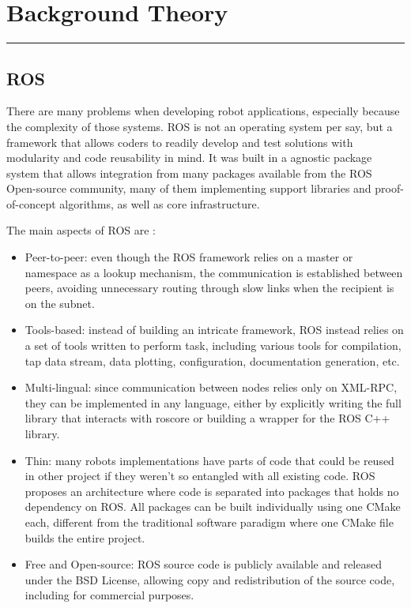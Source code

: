 \chapter{Background Theory}\label{chp:fundament}
\vspace{-1.5cm}
\noindent\rule{\columnwidth}{1.2mm}

%

\section{ROS}

There are many problems when developing robot applications, especially because the complexity of those systems. ROS is not an operating system per say, but a framework that allows coders to readily develop and test solutions with modularity and code reusability in mind. It was built in a agnostic package system that allows integration from many packages available from the ROS Open-source community, many of them implementing support libraries and proof-of-concept algorithms, as well as core infrastructure.

The main aspects of ROS are \cite{quigley2009ros}:

\begin{itemize}
\item Peer-to-peer: even though the ROS framework relies on a master or namespace as a lookup mechanism, the communication is established between peers, avoiding unnecessary routing through slow links when the recipient is on the subnet.
\item Tools-based: instead of building an intricate framework, ROS instead relies on a set of tools written to perform task, including various tools for compilation, tap data stream, data plotting, configuration, documentation generation, etc.
\item Multi-lingual: since communication between nodes relies only on XML-RPC, they can be implemented in any language, either by explicitly writing the full library that interacts with roscore or building a wrapper for the ROS C++ library.
\item Thin: many robots implementations have parts of code that could be reused in other project if they weren't so entangled with all existing code. ROS proposes an architecture where code is separated into packages that holds no dependency on ROS. All packages can be built individually using one CMake each, different from the traditional software paradigm where one CMake file builds the entire project.
\item Free and Open-source: ROS source code is publicly available and released under the BSD License, allowing copy and redistribution of the source code, including for commercial purposes.
\end{itemize}

